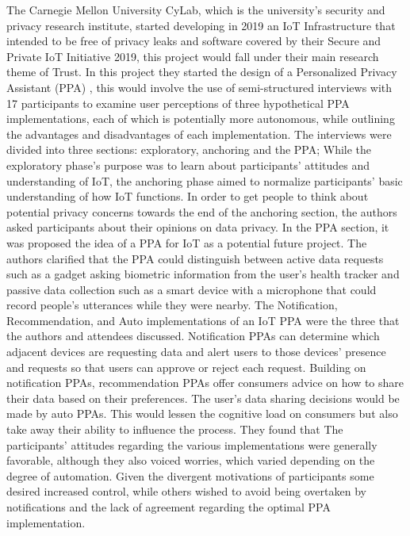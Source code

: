 \documentclass[conference]{IEEEtran}
\begin{document}
The Carnegie Mellon University CyLab, which is the university's security and
privacy research institute, started developing in 2019 an IoT Infrastructure
that intended to be free of privacy leaks and software covered by their
Secure and Private IoT Initiative 2019, this project would fall under their
main research theme of Trust. In this project they started the design of a
Personalized Privacy Assistant (PPA) \cite{ColnagoInforming}, this would involve the use of semi-structured
interviews with 17 participants to examine user perceptions of three hypothetical
PPA implementations, each of which is potentially more autonomous,
while outlining the advantages and disadvantages of each implementation.
The interviews were divided into three sections: exploratory, anchoring and the PPA;
While the exploratory phase's purpose was to learn about participants' attitudes
and understanding of IoT, the anchoring phase aimed to normalize participants' basic
understanding of how IoT functions. In order to get people to think about potential
privacy concerns towards the end of the anchoring section, the authors asked
participants about their opinions on data privacy. In the PPA section, it was proposed
the idea of a PPA for IoT as a potential future project. The authors clarified that
the PPA could distinguish between active data requests such as a gadget asking
biometric information from the user's health tracker and passive data collection
such as a smart device with a microphone that could record people's utterances
while they were nearby. The Notification, Recommendation, and Auto implementations
of an IoT PPA were the three that the authors and attendees discussed.
Notification PPAs can determine which adjacent devices are requesting data
and alert users to those devices' presence and requests so that users can
approve or reject each request.
Building on notification PPAs, recommendation PPAs offer consumers advice
on how to share their data based on their preferences.
The user's data sharing decisions would be made by auto PPAs. This would
lessen the cognitive load on consumers but also take away their ability to
influence the process.
They found that The participants' attitudes regarding the various implementations
were generally favorable, although they also voiced worries, which varied
depending on the degree of automation. Given the divergent motivations of
participants some desired increased control, while others wished to avoid
being overtaken by notifications and the lack of agreement regarding the
optimal PPA implementation.
\end{document}

